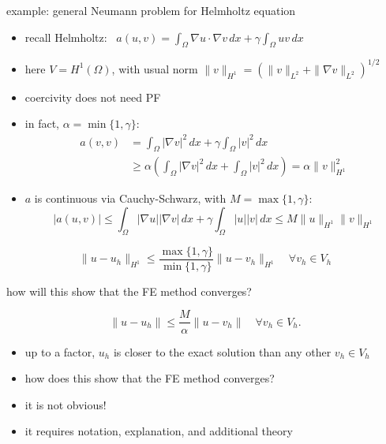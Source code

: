 \documentclass[10pt,
               svgnames,
               hyperref={colorlinks,
                         citecolor=DeepPink4,
                         linkcolor=FireBrick,
                         urlcolor=blue},
               usepdftitle=false]{beamer}
\newcommand{\grad}{\nabla}
\newcommand{\ds}{\displaystyle}
\begin{document}
\begin{frame}{example: general Neumann problem for Helmholtz equation}

\begin{itemize}
\item recall Helmholtz: \, $\ds a(u,v) = \int_\Omega \grad u\cdot \grad v\,dx + \gamma \int_\Omega u v\,dx$
\item here $V=H^1(\Omega)$, with usual norm $\|v\|_{H^1} = \left(\|v\|_{L^2} + \|\grad v\|_{L^2}\right)^{1/2}$
\item coercivity does not need PF
\item in fact, $\alpha=\min\{1,\gamma\}$:
\begin{align*}
a(v,v) &= \int_\Omega |\grad v|^2\,dx + \gamma \int_\Omega |v|^2\,dx \\
     &\ge \alpha \left(\int_\Omega |\grad v|^2\,dx + \int_\Omega |v|^2\,dx\right) = \alpha \|v\|_{H^1}^2
\end{align*}
\item $a$ is continuous via Cauchy-Schwarz, with $M=\max\{1,\gamma\}$:
	$$|a(u,v)| \le \int_\Omega |\grad u||\grad v|\,dx + \gamma \int_\Omega |u||v|\,dx \le M \|u\|_{H^1} \|v\|_{H^1}$$
\end{itemize}

\begin{corollary}
	$$\|u-u_h\|_{H^1} \le \frac{\max\{1,\gamma\}}{\min\{1,\gamma\}} \|u-v_h\|_{H^1} \quad \forall v_h\in V_h$$
\end{corollary}
\end{frame}


\begin{frame}{how will this show that the FE method converges?}

\begin{lemma}
	$$\|u-u_h\| \le \frac{M}{\alpha} \|u-v_h\| \quad \forall v_h \in V_h.$$
\end{lemma}

\begin{itemize}
\item up to a factor, $u_h$ is closer to the exact solution than any other $v_h\in V_h$
\item how does this show that the FE method converges?
\item it is not obvious!
\item it requires notation, explanation, and additional theory
\end{itemize}
\end{frame}
\end{document}

